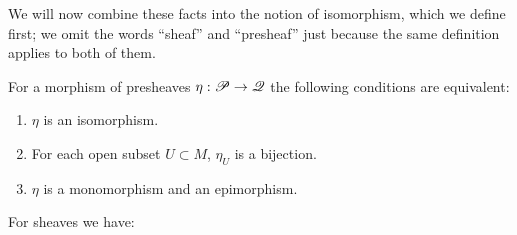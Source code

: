 We will now combine these facts into the notion of isomorphism, which we define first; we omit the words ``sheaf'' and ``presheaf'' just because the same definition applies to both of them.

\begin{theorem}
For a morphism of presheaves $\eta :\mathscr{P}\to \mathscr{Q}$ the following conditions are equivalent:
\begin{enumerate}
\item $\eta$ is an isomorphism.
\item For each open subset $U\subset M$, $\eta_U$ is a bijection.
\item $\eta$ is a monomorphism and an epimorphism.
\end{enumerate}
\end{theorem}

For sheaves we have:

